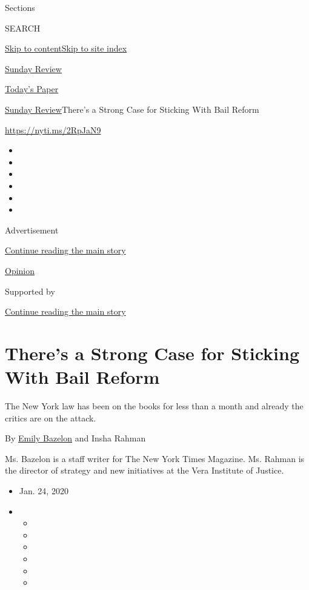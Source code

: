 Sections

SEARCH

\protect\hyperlink{site-content}{Skip to
content}\protect\hyperlink{site-index}{Skip to site index}

\href{https://www.nytimes3xbfgragh.onion/section/opinion/sunday}{Sunday
Review}

\href{https://myaccount.nytimes3xbfgragh.onion/auth/login?response_type=cookie\&client_id=vi}{}

\href{https://www.nytimes3xbfgragh.onion/section/todayspaper}{Today's
Paper}

\href{/section/opinion/sunday}{Sunday Review}\textbar{}There's a Strong
Case for Sticking With Bail Reform

\url{https://nyti.ms/2RpJaN9}

\begin{itemize}
\item
\item
\item
\item
\item
\item
\end{itemize}

Advertisement

\protect\hyperlink{after-top}{Continue reading the main story}

\href{/section/opinion}{Opinion}

Supported by

\protect\hyperlink{after-sponsor}{Continue reading the main story}

\hypertarget{theres-a-strong-case-for-sticking-with-bail-reform}{%
\section{There's a Strong Case for Sticking With Bail
Reform}\label{theres-a-strong-case-for-sticking-with-bail-reform}}

The New York law has been on the books for less than a month and already
the critics are on the attack.

By \href{https://www.nytimes3xbfgragh.onion/by/emily-bazelon}{Emily
Bazelon} and Insha Rahman

Ms. Bazelon is a staff writer for The New York Times Magazine. Ms.
Rahman is the director of strategy and new initiatives at the Vera
Institute of Justice.

\begin{itemize}
\item
  Jan. 24, 2020
\item
  \begin{itemize}
  \item
  \item
  \item
  \item
  \item
  \item
  \end{itemize}
\end{itemize}

